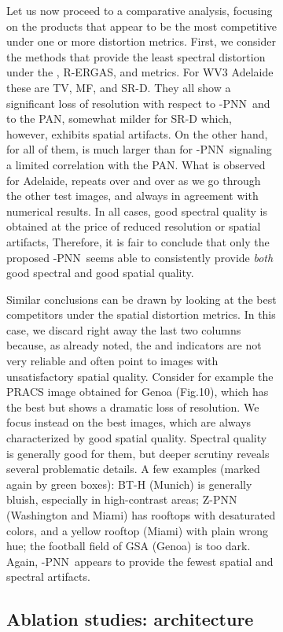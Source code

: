 \documentclass[journal]{IEEEtran}
\newcommand{\LPNN}  {-PNN}
\begin{document}
\begin{figure}
\begin{figure}
Let us now proceed to a comparative analysis,
focusing on the products that appear to be the most competitive under one or more distortion metrics.
First, we consider the methods that provide the least spectral distortion under the , R-ERGAS, and  metrics.
For WV3 Adelaide these are TV, MF, and SR-D.
They all show a significant loss of resolution with respect to \LPNN\ and to the PAN,
somewhat milder for SR-D which, however, exhibits spatial artifacts.
On the other hand, for all of them,  is much larger than for \LPNN\, signaling a limited correlation with the PAN.
What is observed for Adelaide, repeats over and over as we go through the other test images, and always in agreement with numerical results.
In all cases, good spectral quality is obtained at the price of reduced resolution or spatial artifacts,
Therefore, it is fair to conclude that only the proposed \LPNN\ seems able to
consistently provide {\em both} good spectral and good spatial quality.

Similar conclusions can be drawn by looking at the best competitors under the spatial distortion metrics.
In this case, we discard right away the last two columns because,
as already noted, the  and  indicators are not very reliable and often point to images with unsatisfactory spatial quality.
Consider for example the PRACS image obtained for Genoa (Fig.10), which has the best  but shows a dramatic loss of resolution.
We focus instead on the best  images, which are always characterized by good spatial quality.
Spectral quality is generally good for them, but deeper scrutiny reveals several problematic details.
A few examples (marked again by green boxes):
BT-H (Munich) is generally bluish, especially in high-contrast areas;
Z-PNN (Washington and Miami) has rooftops with desaturated colors, and a yellow rooftop (Miami) with plain wrong hue;
the football field of GSA (Genoa) is too dark.
Again, \LPNN\ appears to provide the fewest spatial and spectral artifacts.


\subsection{Ablation studies: architecture}


\end{figure}
\end{figure}
\end{document}
